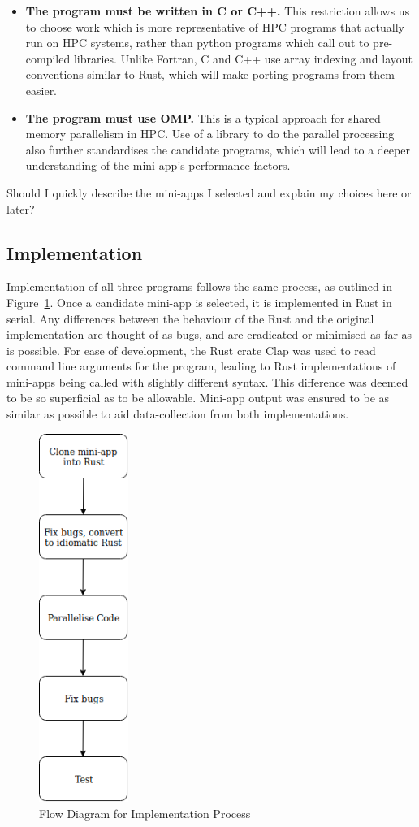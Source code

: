 \begin{itemize}
  \item \textbf{The program must be written in C or C++.} This restriction allows us to choose work which is more representative of HPC programs that actually run on HPC systems, rather than python programs which call out to pre-compiled libraries. Unlike Fortran, C and C++ use array indexing and layout conventions similar to Rust, which will make porting programs from them easier.

  \item \textbf{The program must use OMP.} This is a typical approach for shared memory parallelism in HPC. Use of a library to do the parallel processing also further standardises the candidate programs, which will lead to a deeper understanding of the mini-app's performance factors.
\end{itemize}

Should I quickly describe the mini-apps I selected and explain my choices here or later?

\subsection{Implementation}
Implementation of all three programs follows the same process, as outlined in Figure~\ref{fig:imp-flow}. Once a candidate mini-app is selected, it is implemented in Rust in serial. Any differences between the  behaviour of the Rust and the original implementation are thought of as bugs, and are eradicated or minimised as far as is possible. For ease of development, the Rust crate Clap was used to read command line arguments for the program, leading to Rust implementations of mini-apps being called with slightly different syntax. This difference was deemed to be so superficial as to be allowable. Mini-app output was ensured to be as similar as possible to aid data-collection from both implementations.

\begin{figure}
  \center
  \includegraphics[height=12cm]{figs/ImplementationFlow.png}
  \caption{Flow Diagram for Implementation Process}
  \label{fig:imp-flow}
\end{figure}

